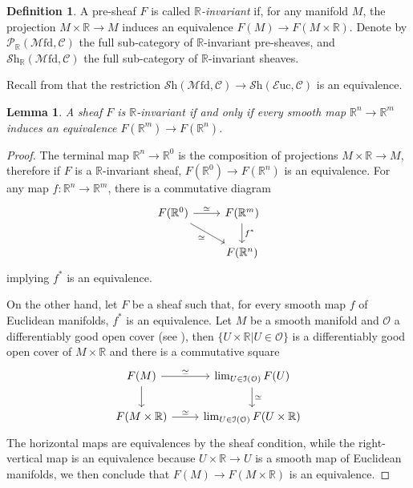 \documentclass[a4paper]{book}
\newcommand{\lC}{\mathcal{C}}
\newcommand{\lE}{\mathcal{E}}
\newcommand{\lI}{\mathcal{I}}
\newcommand{\lM}{\mathcal{M}}
\newcommand{\lO}{\mathcal{O}}
\newcommand{\lP}{\mathcal{P}}
\newcommand{\bR}{\mathbb{R}}
\newcommand{\lS}{\mathcal{S}}
\newcommand{\Shv}{\lS\mathrm{h}} %
\newcommand{\Euc}{\lE\mathrm{uc}} %
\newcommand{\Mfd}{\lM\mathrm{fd}} %
\newtheorem{lemma}[equation]{Lemma}
\theoremstyle{definition}
\newtheorem{definition}[equation]{Definition}
\theoremstyle{remark}
\numberwithin{equation}{section}
\begin{document}
\begin{definition}
  A pre-sheaf $F$ is called \emph{$\mathbb{R}$-invariant} if, for any manifold $M$, the projection $M\times\bR\to M$ induces an equivalence $F(M)\to F(M\times\bR)$. Denote by $\lP_{\bR}(\Mfd,\lC)$ the full sub-category of $\bR$-invariant pre-sheaves, and $\Shv_\bR(\Mfd,\lC)$ the full sub-category of $\bR$-invariant sheaves. 
\end{definition}
Recall from \cite{berkenhagen2025diffcoh3} that the restriction $\Shv(\Mfd,\lC)\to\Shv(\Euc,\lC)$ is an equivalence. 
\begin{lemma}\label{lem:inv}
  A sheaf $F$ is $\bR$-invariant if and only if every smooth map $\bR^n\to\bR^m$ induces an equivalence $F(\bR^m)\to F(\bR^n)$. 
\end{lemma}
\begin{proof}
  The terminal map $\bR^n\to\bR^0$ is the composition of projections $M\times\bR\to M$, therefore if $F$ is a $\bR$-invariant sheaf, $F(\bR^0)\to F(\bR^n)$ is an equivalence. For any map $f:\bR^n\to\bR^m$, there is a commutative diagram \begin{equation}
    \begin{tikzcd}
      F(\bR^0) \arrow[rd,"\simeq"'] \arrow[r,"\simeq"] & F(\bR^m) \arrow[d,"f^*"] \\
      & F(\bR^n)
    \end{tikzcd}
  \end{equation}implying $f^*$ is an equivalence. 

  On the other hand, let $F$ be a sheaf such that, for every smooth map $f$ of Euclidean manifolds, $f^*$ is an equivalence. Let $M$ be a smooth manifold and $\lO$ a differentiably good open cover (see \cite[Theorem 5.4]{nanto2025diffcoh4}), then $\{U\times\bR|U\in\lO\}$ is a differentiably good open cover of $M\times\bR$ and there is a commutative square \begin{equation}
    \begin{tikzcd}
      F(M) \arrow[r,"\simeq"] \arrow[d] & \lim_{U\in\lI(\lO)}F(U) \arrow[d,"\simeq"] \\
      F(M\times\bR) \arrow[r,"\simeq"] & \lim_{U\in\lI(\lO)} F(U\times\bR) 
    \end{tikzcd}
  \end{equation}The horizontal maps are equivalences by the sheaf condition, while the right-vertical map is an equivalence because $U\times\bR\to U$ is a smooth map of Euclidean manifolds, we then conclude that $F(M)\to F(M\times\bR)$ is an equivalence. 
\end{proof}
\end{document}
